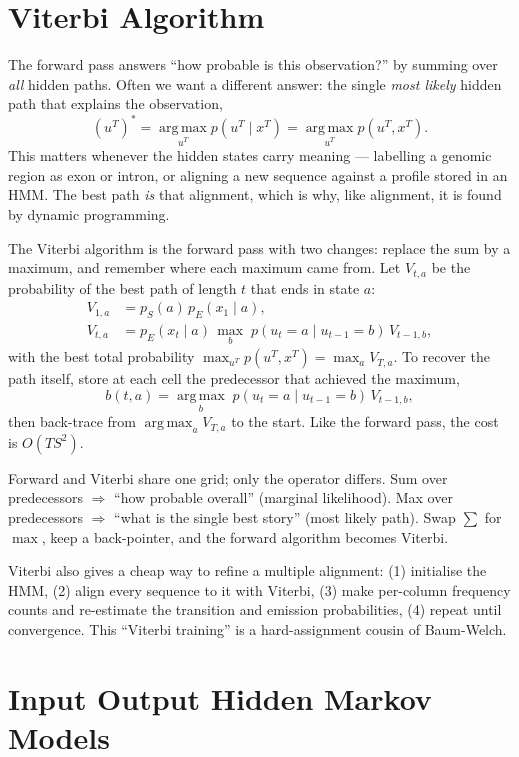 \documentclass[11pt, oneside]{book}
\newcommand{\argmax}{\operatorname*{arg\,max}}
\begin{document}
\section{Viterbi Algorithm}

The forward pass answers ``how probable is this observation?'' by summing over
\emph{all} hidden paths. Often we want a different answer: the single
\emph{most likely} hidden path that explains the observation,
\[
  (u^T)^\ast = \argmax_{u^T} p(u^T \mid x^T) = \argmax_{u^T} p(u^T, x^T).
\]
This matters whenever the hidden states carry meaning — labelling a genomic
region as exon or intron, or aligning a new sequence against a profile stored in
an HMM. The best path \emph{is} that alignment, which is why, like alignment, it
is found by dynamic programming.

The Viterbi algorithm is the forward pass with two changes: replace the sum by a
maximum, and remember where each maximum came from. Let $V_{t,a}$ be the
probability of the best path of length $t$ that ends in state $a$:
\begin{align*}
  V_{1,a} &= p_S(a)\, p_E(x_1 \mid a), \\
  V_{t,a} &= p_E(x_t \mid a)\, \max_{b}\; p(u_t = a \mid u_{t-1} = b)\, V_{t-1,b},
\end{align*}
with the best total probability $\max_{u^T} p(u^T, x^T) = \max_a V_{T,a}$. To
recover the path itself, store at each cell the predecessor that achieved the
maximum,
\[
  b(t,a) = \argmax_{b}\; p(u_t = a \mid u_{t-1} = b)\, V_{t-1,b},
\]
then back-trace from $\argmax_a V_{T,a}$ to the start. Like the forward pass, the
cost is $O(T S^2)$.

\begin{intbox}
Forward and Viterbi share one grid; only the operator differs. Sum over
predecessors $\Rightarrow$ ``how probable overall'' (marginal likelihood). Max
over predecessors $\Rightarrow$ ``what is the single best story'' (most likely
path). Swap $\sum$ for $\max$, keep a back-pointer, and the forward algorithm
becomes Viterbi.
\end{intbox}

Viterbi also gives a cheap way to refine a multiple alignment: (1) initialise the
HMM, (2) align every sequence to it with Viterbi, (3) make per-column frequency
counts and re-estimate the transition and emission probabilities, (4) repeat
until convergence. This ``Viterbi training'' is a hard-assignment cousin of
Baum-Welch.

\section{Input Output Hidden Markov Models}
\end{document}

